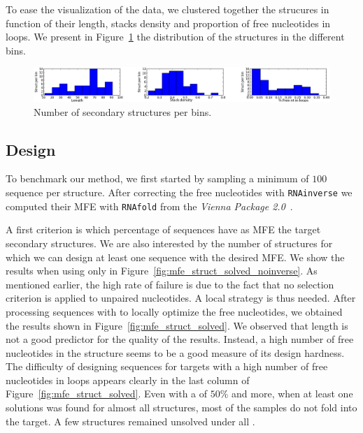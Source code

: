  To ease the visualization of the data, we clustered together the strucures
 in function of their length, stacks density and proportion of free 
 nucleotides in loops. We present in Figure~\ref{fig:bins} the distribution
 of the structures in the different bins.
 
 \begin{figure}[ht!]
 	\centering
	\includegraphics[width=\textwidth]{Figures/bins_distribution.png}
	\caption{Number of secondary structures per bins.}
	\label{fig:bins}
 \end{figure}
 
 
\subsection{Design}
 To benchmark our method, we first started by sampling a minimum
 of $100$ sequence per structure. After correcting the free nucleotides with
 \texttt{RNAinverse} we computed their MFE with \texttt{RNAfold} from the \textit{Vienna Package 2.0}~\cite{Hofacker:1994}.
 
A first criterion is which percentage of sequences have as MFE the target
secondary structures. We are also interested by the number of structures
for which we can design at least one sequence with the desired MFE.
We show the results when using only \ourprog in 
 Figure~\ref{fig:mfe_struct_solved_noinverse}. As mentioned earlier, the high rate of failure
is due to the fact that no selection criterion is applied to
unpaired nucleotides. A local strategy is thus needed.
After processing \ourprog sequences with \RNAinverse to 
locally optimize the free nucleotides, we obtained the results 
shown in Figure~\ref{fig:mfe_struct_solved}. We observed
that length is not a good predictor for the quality of the results. Instead,
a high number of free nucleotides in the structure seems to be a 
good measure of its design hardness. 
 The difficulty of 
designing sequences for targets with a high number of free nucleotides 
 in loops appears clearly in the last column of Figure~\ref{fig:mfe_struct_solved}.
Even with a \GCContent of $50\%$ and more, when at least
one solutions was found for almost all structures, most of the samples 
do not fold into the target. A few structures remained unsolved under
all \GCContent.


